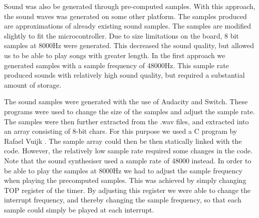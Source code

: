 
Sound was also be generated through pre-computed samples. With this approach, the sound waves was generated on some other platform. The samples produced are approximations of already existing sound samples. The samples are modified slightly to fit the microcontroller. Due to size limitations on the board, 8 bit samples at 8000Hz were generated. This decreased the sound quality, but allowed us to be able to play songs with greater length. In the first approach we generated samples with a sample frequency of 48000Hz. This sample rate produced sounds with relatively high sound quality, but required a substantial amount of storage.

The sound samples were generated with the use of Audacity\cite{audacity} and Switch\cite{switch}. These programs were used to change the size of the samples and adjust the sample rate. The samples were then further extracted from the .wav files, and extracted into an array consisting of 8-bit chars. For this purpose we used a C program by Rafael Vuijk \cite{darkfader}. The sample array could then be then statically linked with the code. However, the relatively low sample rate required some changes in the code. Note that the sound synthesiser used a sample rate of 48000 instead. In order to be able to play the samples at 8000Hz we had to adjust the sample frequency when playing the precomputed samples. This was achieved by simply changing TOP register of the timer. By adjusting this register we were able to change the interrupt frequency, and thereby changing the sample frequency, so that each sample could simply be played at each interrupt.  



  











